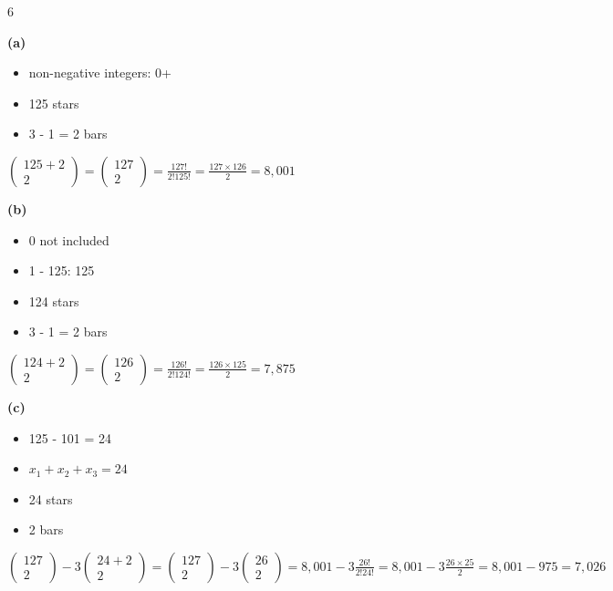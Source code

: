 \documentclass[12 pt]{article}
\begin{document}
    \begin{exercise}{6}
    \hfill

    \textbf{(a)}
    \begin{itemize}
        \item non-negative integers: 0+
        \item 125 stars
        \item 3 - 1 = 2 bars
    \end{itemize}

    $\begin{pmatrix}
        125 + 2 \\
        2
    \end{pmatrix} = \begin{pmatrix}
        127 \\
        2
    \end{pmatrix} = \frac{127!}{2!125!} = \frac{127 \times 126}{2} = 8,001$

    \textbf{(b)}
    \begin{itemize}
        \item 0 not included
        \item 1 - 125: 125
        \item 124 stars
        \item  3 - 1 = 2 bars
    \end{itemize}

    $\begin{pmatrix}
        124 + 2 \\
        2
    \end{pmatrix} = \begin{pmatrix}
        126 \\
        2
    \end{pmatrix} = \frac{126!}{2!124!} = \frac{126 \times 125}{2} = 7,875$

    \textbf{(c)}
    \begin{itemize}
        \item 125 - 101 = 24
        \item $x_1 + x_2 + x_3 = 24$
        \item 24 stars
        \item 2 bars
    \end{itemize}

    $\begin{pmatrix}
        127 \\
        2
    \end{pmatrix} - 3 \begin{pmatrix}
        24 + 2 \\
        2
    \end{pmatrix} = \begin{pmatrix}
        127 \\
        2
    \end{pmatrix} - 3 \begin{pmatrix}
        26 \\
        2
    \end{pmatrix} = 8,001 - 3 \frac{26!}{2!24!} = 8,001 - 3 \frac{26 \times 25}{2} = 8,001 - 975 = 7,026$  
    \end{exercise}
\end{document}
